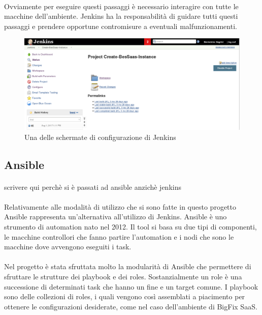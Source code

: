 \paragraph{}
Ovviamente per eseguire questi passaggi è necessario interagire con tutte le macchine dell'ambiente. Jenkins ha la responsabilità di guidare tutti questi passaggi e prendere opportune contromisure a eventuali malfunzionamenti. 
\begin{figure}[h]
	\centering
	\includegraphics[width=0.7\linewidth]{capitoli/imgs/jenkisProj}
	\caption{Una delle schermate di configurazione di Jenkins}
	\label{fig:jenkisproj}
\end{figure}

\subsection{Ansible}
\paragraph{}
scrivere qui perchè si è passati ad ansible anzichè jenkins
\paragraph{}
Relativamente alle modalità di utilizzo che si sono fatte in questo progetto Ansible rappresenta un'alternativa all'utilizzo di Jenkins. Ansible è uno strumento di automation nato nel 2012. Il tool si basa su due tipi di componenti, le macchine controllori che fanno partire l'automation e i nodi che sono le macchine dove avvengono eseguiti i task. 
\paragraph{}
Nel progetto è stata sfruttata molto la modularità di Ansible che permettere di sfruttare le strutture dei playbook e dei roles. Sostanzialmente un role è una successione di determinati task che hanno un fine e un target comune. I playbook sono delle collezioni di roles, i quali vengono così assemblati a piacimento per ottenere le configurazioni desiderate, come nel caso dell'ambiente di BigFix SaaS. 
